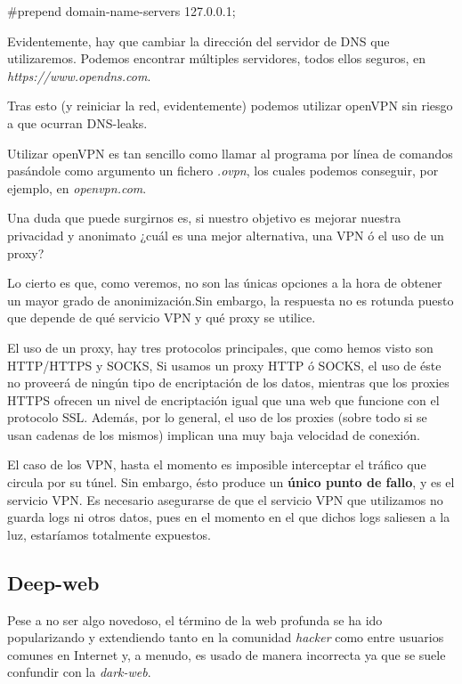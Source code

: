 	{\selectfont 
		\#prepend domain-name-servers 127.0.0.1;
	}

	Evidentemente, hay que cambiar la dirección del servidor de
        DNS que utilizaremos. Podemos encontrar múltiples servidores,
        todos ellos seguros, en \textit{https://www.opendns.com}.
	
	Tras esto (y reiniciar la red, evidentemente) podemos utilizar
        openVPN sin riesgo a que ocurran DNS-leaks. 
	
	Utilizar openVPN es tan sencillo como llamar al programa por línea de comandos pasándole como argumento un fichero \textit{.ovpn}, los cuales podemos conseguir, por ejemplo, en \textit{openvpn.com}.
	
	Una duda que puede surgirnos es, si nuestro objetivo es mejorar nuestra privacidad y anonimato ¿cuál es una mejor alternativa, una VPN ó el uso de un proxy? 
	
	Lo cierto es que, como veremos, no son las únicas opciones a la hora de obtener un mayor grado de anonimización.Sin embargo, la respuesta no es rotunda puesto que depende de qué servicio VPN y qué proxy se utilice.
	
	El uso de un proxy, hay tres protocolos principales, que como
        hemos visto son HTTP/HTTPS y SOCKS, Si usamos un proxy HTTP ó
        SOCKS, el uso de éste no proveerá de ningún tipo de
        encriptación de los datos, mientras que los proxies HTTPS
        ofrecen un nivel de encriptación igual que una web que
        funcione con el protocolo SSL. Además, por lo general, el uso
        de los proxies (sobre todo si se usan cadenas de los mismos)
        implican una muy baja velocidad de conexión.
	
	El caso de los VPN, hasta el momento es imposible interceptar
        el tráfico que circula por su túnel. Sin embargo, ésto produce
        un \textbf{único punto de fallo}, y es el servicio VPN. Es
        necesario asegurarse de que el servicio VPN que utilizamos no
        guarda logs ni otros datos, pues en el momento en el que
        dichos logs saliesen a la luz, estaríamos totalmente
        expuestos.  
\subsection {Deep-web}
Pese a no ser algo novedoso, el término de la web profunda se ha ido
popularizando y extendiendo tanto en la comunidad \textit{hacker} como
entre usuarios comunes en Internet y, a menudo, es usado de manera
incorrecta ya que se suele confundir con la \textit{dark-web}.

